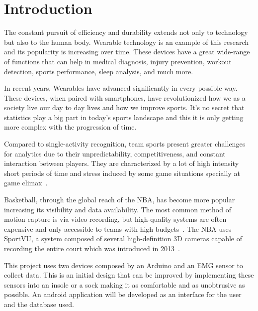 

%

\chapter{Introduction}
\label{cha:introduction}

The constant pursuit of efficiency and durability extends not only to technology but also to the human body. Wearable technology is an example of this research and its popularity is increasing over time. 
These devices have a great wide-range of functions that can help in medical diagnosis, injury prevention, workout detection, sports performance, sleep analysis, and much more.

In recent years, Wearables have advanced significantly in every possible way. These devices, when paired with smartphones, have revolutionized how we as a society live our day to day lives and how 
we improve sports. It's no secret that statistics play a big part in today's sports landscape and this it is only getting more complex with the progression of time.

Compared to single-activity recognition, team sports present greater challenges for analytics due to their unpredictability, competitiveness, and constant interaction between players. 
They are characterized by a lot of high intensity short periods of time and stress induced by some game situations specially at game climax~\cite{performanceAndTactics}. 

Basketball, through the global reach of the NBA, has become more popular increasing its visibility and data availability. The most common method 
of motion capture is via video recording, but high-quality systems are often expensive and only accessible to teams with high budgets~\cite{basketballMotions}. 
The NBA uses SportVU, a system composed of several high-definition 3D cameras capable of recording the entire court which was introduced in 2013~\cite{basketballFootwork}.

This project uses two devices composed by an Arduino and an \gls{EMG} sensor to collect data. This is an initial design that can be improved by implementing these sensors into an 
insole or a sock making it as comfortable and as unobtrusive as possible. An android application will be developed as an interface for the user and the database used.

